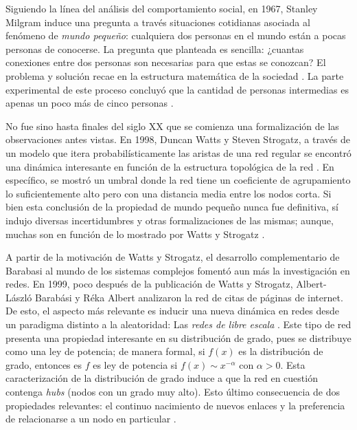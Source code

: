 \documentclass[../main.tex]{subfiles}
\begin{document}

Siguiendo la línea del análisis del comportamiento social, en 1967, Stanley Milgram induce una pregunta a través situaciones cotidianas asociada al fenómeno de \textit{mundo pequeño}: cualquiera dos personas en el mundo están a pocas personas de conocerse. La pregunta que planteada es sencilla: ¿cuantas conexiones entre dos personas son necesarias para que estas se conozcan? El problema y solución recae en la estructura matemática de la sociedad \cite{milgram1967small}. La parte experimental de este proceso concluyó que la cantidad de personas intermedias es apenas un poco más de cinco personas \cite{milgram1967small}.


No fue sino hasta finales del siglo XX que se comienza una formalización de las observaciones antes vistas. En 1998, Duncan Watts  y  Steven Strogatz, a través de un modelo que itera probabilísticamente las aristas de una red regular se encontró una dinámica interesante en función de la estructura topológica de la red \cite{Watts1998}. En específico, se mostró un umbral donde la red tiene un coeficiente de agrupamiento lo suficientemente alto pero con una distancia media entre los nodos corta.  Si bien esta conclusión de la propiedad de mundo pequeño nunca fue definitiva, sí indujo diversas incertidumbres y otras formalizaciones de las mismas; aunque, muchas son en función de lo mostrado por Watts y Strogatz \cite{Telesford2011}.


A partir de la motivación de Watts y Strogatz, el desarrollo complementario de Barabasi al mundo de los sistemas complejos fomentó aun más la investigación en redes. En 1999, poco después de la publicación de Watts y Strogatz, Albert-László Barabási y Réka Albert analizaron la red de citas de páginas de internet. De esto, el aspecto más relevante es inducir una nueva dinámica en redes desde un paradigma distinto a la aleatoridad: Las \textit{redes de libre escala} \cite{Barabasi1999}. Este tipo de red presenta una propiedad interesante en su distribución de grado, pues se distribuye como una ley de potencia; de manera formal, si $f(x)$ es la distribución de grado, entonces es $f$ es ley de potencia si $f(x) \sim x^{-\alpha} $ con $\alpha > 0$. Esta caracterización de la distribución de grado induce a que la red en cuestión contenga \textit{hubs} (nodos con un grado muy alto).  Esto último consecuencia de dos propiedades relevantes: el continuo nacimiento de nuevos enlaces y la preferencia de relacionarse a un nodo en particular \cite{Barabsi2005}.
\end{document}
